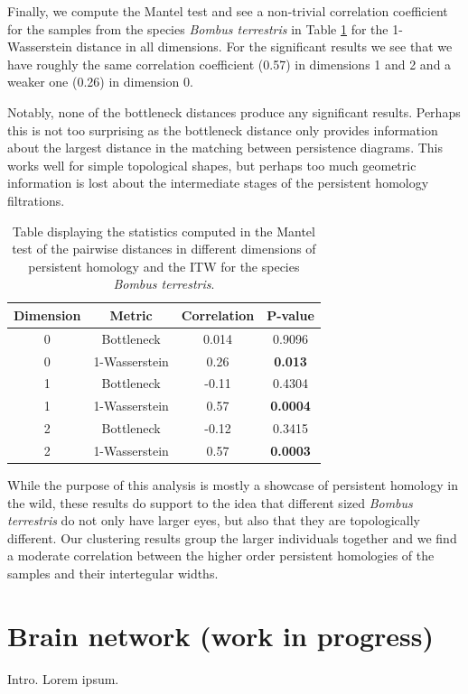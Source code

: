 Finally, we compute the Mantel test and see a non-trivial correlation coefficient for the samples from the species \textit{Bombus terrestris} in Table \ref{mantelc} for the 1-Wasserstein distance in all dimensions. For the significant results we see that we have roughly the same correlation coefficient (0.57) in dimensions 1 and 2 and a weaker one (0.26) in dimension 0.

Notably, none of the bottleneck distances produce any significant results. Perhaps this is not too surprising as the bottleneck distance only provides information about the largest distance in the matching between persistence diagrams. This works well for simple topological shapes, but perhaps too much geometric information is lost about the intermediate stages of the persistent homology filtrations.

\begin{table}[h]
\begin{center}
\begin{tabular}{ | c | c | c | c | }
\hline
  Dimension & Metric & Correlation & P-value \\
  \hline
  0 & Bottleneck & 0.014 & 0.9096 \\
  0 & 1-Wasserstein & 0.26 &  \textbf{0.013} \\
  1 & Bottleneck & -0.11 & 0.4304 \\
  1 & 1-Wasserstein & 0.57 & \textbf{0.0004} \\
  2 & Bottleneck & -0.12 & 0.3415 \\
  2 & 1-Wasserstein & 0.57 & \textbf{0.0003} \\
\hline
\end{tabular}
\end{center}
\caption{\label{mantelc} Table displaying the statistics computed in the Mantel test of the pairwise distances in different dimensions of persistent homology and the ITW for the species \textit{Bombus terrestris}.}
\end{table}
While the purpose of this analysis is mostly a showcase of persistent homology in the wild, these results  do support to the idea that different sized \textit{Bombus terrestris} do not only have larger eyes, but also that they are topologically different. Our clustering results group the larger individuals together and we find a moderate  correlation between the higher order persistent homologies of the samples and their intertegular widths.
\clearpage
\section{Brain network (work in progress)}
Intro. Lorem ipsum.

